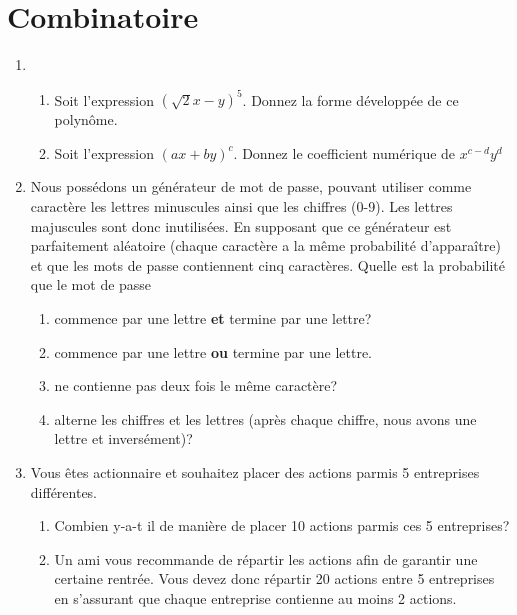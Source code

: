 \documentclass[A4paper,11pt]{article}
\begin{document}
\section{Combinatoire}
\begin{enumerate}
    \item \begin{enumerate}
        \item Soit l'expression $(\sqrt{2}x - y )^5$. Donnez la forme développée de ce polynôme.
        \item Soit l'expression $(ax + by)^c$. Donnez le coefficient numérique de $x^{c-d}y^d$
    \end{enumerate}
    \item Nous possédons un générateur de mot de passe, pouvant utiliser comme caractère les lettres minuscules ainsi que les chiffres (0-9). Les lettres majuscules sont donc inutilisées. En supposant que ce générateur est parfaitement aléatoire (chaque caractère a la même probabilité d'apparaître) et que les mots de passe contiennent cinq caractères. Quelle est la probabilité que le mot de passe
    \begin{enumerate}
        \item  commence par une lettre \textbf{et} termine par une lettre?
        \item  commence par une lettre \textbf{ou} termine par une lettre.
        \item ne contienne pas deux fois le même caractère?
        \item alterne les chiffres et les lettres (après chaque chiffre, nous avons une lettre et inversément)?
    \end{enumerate}
    
    \item Vous êtes actionnaire et souhaitez placer des actions parmis 5 entreprises différentes.
    \begin{enumerate}
        \item Combien y-a-t il de manière de placer 10 actions parmis ces 5 entreprises?
        \item Un ami vous recommande de répartir les actions afin de garantir une certaine rentrée. Vous devez donc répartir 20 actions entre 5 entreprises en s'assurant que chaque entreprise contienne au moins 2 actions.
    \end{enumerate}
\end{enumerate}
\end{document}
